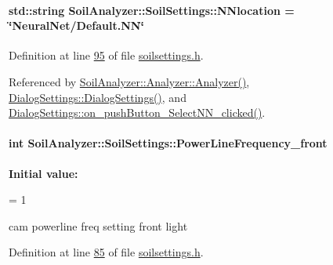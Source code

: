\paragraph[{N\+Nlocation}]{\setlength{\rightskip}{0pt plus 5cm}std\+::string Soil\+Analyzer\+::\+Soil\+Settings\+::\+N\+Nlocation = \char`\"{}Neural\+Net/Default.\+N\+N\char`\"{}}\label{class_soil_analyzer_1_1_soil_settings_a61bb233b0deaed4039b3eb05884a4854}


Definition at line \hyperlink{soilsettings_8h_source_l00095}{95} of file \hyperlink{soilsettings_8h_source}{soilsettings.\+h}.



Referenced by \hyperlink{analyzer_8cpp_source_l00018}{Soil\+Analyzer\+::\+Analyzer\+::\+Analyzer()}, \hyperlink{dialogsettings_8cpp_source_l00005}{Dialog\+Settings\+::\+Dialog\+Settings()}, and \hyperlink{dialogsettings_8cpp_source_l00498}{Dialog\+Settings\+::on\+\_\+push\+Button\+\_\+\+Select\+N\+N\+\_\+clicked()}.

\hypertarget{class_soil_analyzer_1_1_soil_settings_a4fa556e97efddb93d8d5e382ab33c6fd}{}
\paragraph[{Power\+Line\+Frequency\+\_\+front}]{\setlength{\rightskip}{0pt plus 5cm}int Soil\+Analyzer\+::\+Soil\+Settings\+::\+Power\+Line\+Frequency\+\_\+front}\label{class_soil_analyzer_1_1_soil_settings_a4fa556e97efddb93d8d5e382ab33c6fd}
{\bfseries Initial value\+:}
\begin{DoxyCode}
=
      1
\end{DoxyCode}
cam powerline freq setting front light 

Definition at line \hyperlink{soilsettings_8h_source_l00085}{85} of file \hyperlink{soilsettings_8h_source}{soilsettings.\+h}.

\hypertarget{class_soil_analyzer_1_1_soil_settings_a08370685977bf9a200a13da5008f743f}{}
